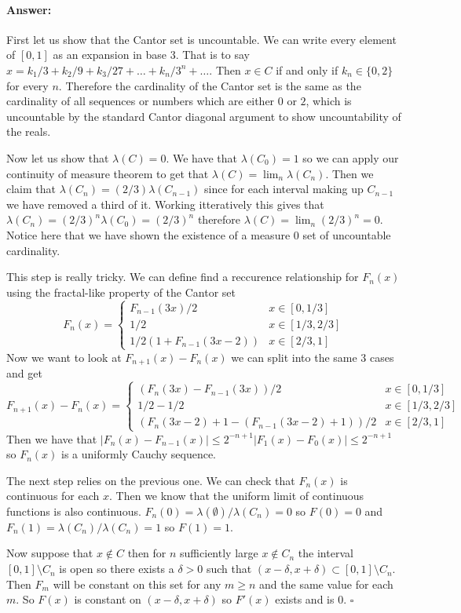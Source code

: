 \documentclass[11pt]{article}
\theoremstyle{definition}
\theoremstyle{remark}
\newenvironment{ans}{\paragraph{Answer:}}{\hfill$\square$\vspace{10pt}}
\begin{document}
\begin{ans}
First let us show that the Cantor set is uncountable. We can write every element of $[0,1]$ as an expansion in base $3$. That is to say $x= k_1/3 + k_2/9 + k_3/27 + \dots + k_n/3^n + \dots$. Then $x \in C$ if and only if $k_n \in \{0,2\}$ for every $n$. Therefore the cardinality of the Cantor set is the same as the cardinality of all sequences or numbers which are either $0$ or $2$, which is uncountable by the standard Cantor diagonal argument to show uncountability of the reals.

Now let us show that $\lambda(C) = 0$. We have that $\lambda(C_0) = 1$ so we can apply our continuity of measure theorem to get that $\lambda(C) = \lim_n \lambda(C_n)$. Then we claim that $\lambda(C_n) = (2/3) \lambda(C_{n-1})$ since for each interval making up $C_{n-1}$ we have removed a third of it. Working itteratively this gives that $\lambda(C_n) = (2/3)^n \lambda(C_0) = (2/3)^n$ therefore $\lambda(C) = \lim_n (2/3)^n = 0$. Notice here that we have shown the existence of a measure 0 set of uncountable cardinality.

This step is really tricky. We can define find a reccurence relationship for $F_n(x)$ using the fractal-like property of the Cantor set
\[  F_n(x) = \left\{ \begin{array}{ll} F_{n-1}(3x)/2 & x \in [0,1/3] \\
1/2 & x \in [1/3,2/3] \\
1/2(1+F_{n-1}(3x-2)) & x \in [2/3,1] \end{array}\right. \] Now we want to look at $F_{n+1}(x) - F_n(x)$ we can split into the same 3 cases and get
\[ F_{n+1}(x) - F_n(x) = \left\{ \begin{array}{ll} (F_n(3x)-F_{n-1}(3x))/2 & x \in [0,1/3] \\
1/2 -1/2 & x \in [1/3,2/3] \\
(F_n(3x-2)+1 -(F_{n-1}(3x-2) +1))/2 & x \in [2/3,1] \end{array}\right. \] Then we have that $|F_n(x) -F_{n-1}(x)| \leq 2^{-n+1}|F_1(x) -F_0(x)| \leq 2^{-n+1}$ so $F_n(x)$ is a uniformly Cauchy sequence.

The next step relies on the previous one. We can check that $F_n(x)$ is continuous for each $x$. Then we know that the uniform limit of continuous functions is also continuous. $F_n(0) = \lambda(\emptyset)/\lambda(C_n) = 0$ so $F(0) = 0$ and $F_n(1) = \lambda(C_n)/\lambda(C_n) = 1$ so $F(1) = 1$.

Now suppose that $x \notin C$ then for $n$ sufficiently large $x \notin C_n$ the interval $[0,1] \setminus C_n$ is open so there exists a $\delta>0$ such that $(x-\delta, x+\delta) \subset [0,1] \setminus C_n$. Then $F_m$ will be constant on this set for any $m \geq n$ and the same value for each $m$. So $F(x)$ is constant on $(x-\delta, x+\delta)$ so $F'(x)$ exists and is $0$.
\end{ans}
\end{document}
